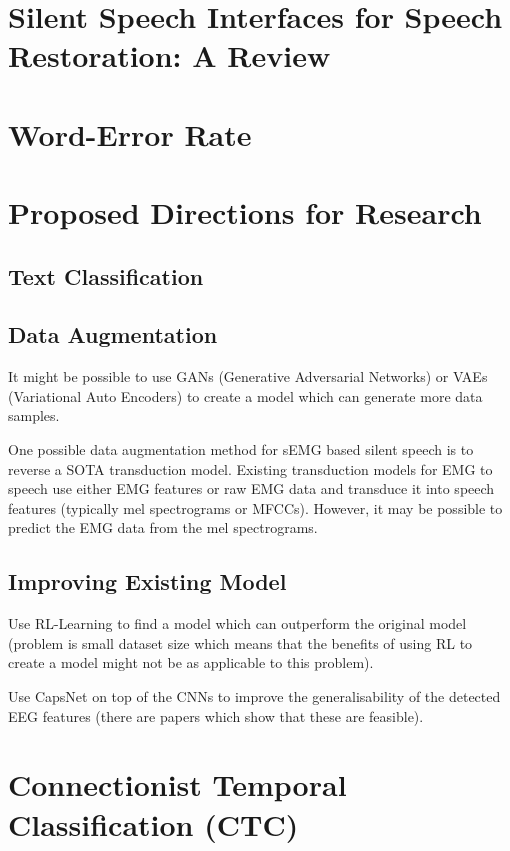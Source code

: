 \section{Silent Speech Interfaces for Speech Restoration: A Review}

\section{Word-Error Rate}



\section{Proposed Directions for Research}

\subsection{Text Classification}

\subsection{Data Augmentation}

It might be possible to use GANs (Generative Adversarial Networks) or
VAEs (Variational Auto Encoders) to create a model which can generate
more data samples.

One possible data augmentation method for sEMG based silent speech is to
reverse a SOTA transduction model. Existing transduction models for
EMG to speech use either EMG features or raw EMG data and transduce
it into speech features (typically mel spectrograms or MFCCs). However,
it may be possible to predict the EMG data from the mel spectrograms.

\subsection{Improving Existing Model}

Use RL-Learning to find a model which can outperform the original model
(problem is small dataset size which means that the benefits of using RL
to create a model might not be as applicable to this problem).

Use CapsNet on top of the CNNs to improve the generalisability of the
detected EEG features (there are papers which show that these are
feasible).

\section{Connectionist Temporal Classification (CTC)}

